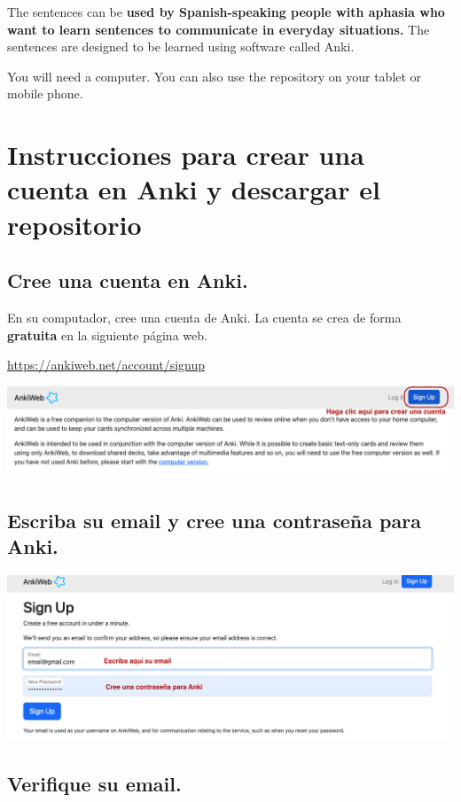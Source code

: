 \documentclass[
]{book}
\begin{document}
The sentences can be \textbf{used by Spanish-speaking people with aphasia who want to learn sentences to communicate in everyday situations.} The sentences are designed to be learned using software called Anki.

You will need a computer. You can also use the repository on your tablet or mobile phone.

\hypertarget{cross_0}{%
\chapter{Instrucciones para crear una cuenta en Anki y descargar el repositorio}\label{cross_0}}

\hypertarget{cree-una-cuenta-en-anki.}{%
\section{Cree una cuenta en Anki.}\label{cree-una-cuenta-en-anki.}}

En su computador, cree una cuenta de Anki. La cuenta se crea de forma \textbf{gratuita} en la siguiente página web.

\url{https://ankiweb.net/account/signup}

\includegraphics[width=1\linewidth]{images/reposit_sp/sign_up}

\hypertarget{cross_1}{%
\section{Escriba su email y cree una contraseña para Anki.}\label{cross_1}}

\includegraphics[width=1\linewidth]{images/reposit_sp/email_password}

\hypertarget{verifique-su-email.}{%
\section{Verifique su email.}\label{verifique-su-email.}}
\end{document}
